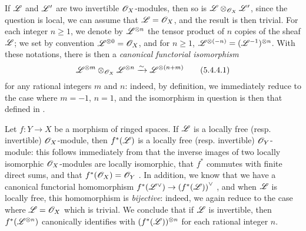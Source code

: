 \begin{env}[5.4.4]
\label{0.5.4.4}
If $\mathscr{L}$ and $\mathscr{L}'$ are two invertible $\mathscr{O}_X$-modules, then so is $\mathscr{L}\otimes_{\mathscr{O}_X}\mathscr{L}'$, since the question is local, we can assume that $\mathscr{L}=\mathscr{O}_X$, and the result is then trivial.
For each integer $n\geqslant 1$, we denote by $\mathscr{L}^{\otimes n}$ the tensor product of $n$ copies of the sheaf
$\mathscr{L}$; we set by convention $\mathscr{L}^{\otimes 0}=\mathscr{O}_X$, and for $n\geqslant 1$, $\mathscr{L}^{\otimes(-n)}=(\mathscr{L}^{-1})^{\otimes n}$.
With these notations, there is then a \emph{canonical functorial isomorphism}
\[
  \mathscr{L}^{\otimes m}\otimes_{\mathscr{O}_X}\mathscr{L}^{\otimes n}\xrightarrow{\sim}\mathscr{L}^{\otimes(n+m)}
  \tag{5.4.4.1}
\]
for any rational integers $m$ and $n$:
indeed, by definition, we immediately reduce to the case where $m=-1$, $n=1$, and the isomorphism in question is then that defined in .
\end{env}

\begin{env}[5.4.5]
\label{0.5.4.5}
Let $f:Y\to X$ be a morphism of ringed spaces.
If $\mathscr{L}$ is a locally free (resp. invertible) $\mathscr{O}_X$-module, then $f^*(\mathscr{L})$ is a locally free (resp. invertible) $\mathscr{O}_Y$-module:
this follows immediately from that the inverse images of two locally isomorphic $\mathscr{O}_X$-modules are locally isomorphic, that $f^*$ commutes with finite direct sums, and that $f^*(\mathscr{O}_X)=\mathscr{O}_Y$ .
In addition, we know that we have a canonical functorial homomorphism $f^*(\dual{\sh{L}})\to\dual{(f^*(\sh{L}))}$ , and when $\mathscr{L}$ is locally free, this homomorphism is \emph{bijective}:
indeed, we again reduce to the case where $\mathscr{L}=\mathscr{O}_X$ which is trivial.
We conclude that if $\mathscr{L}$ is invertible, then $f^*(\mathscr{L}^{\otimes n})$ canonically identifies with $(f^*(\mathscr{L}))^{\otimes n}$ for each rational integer $n$.
\end{env}

